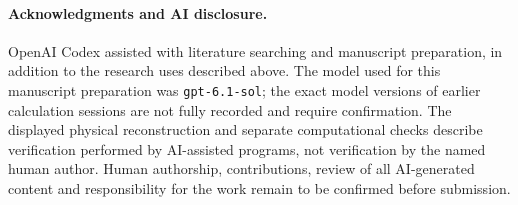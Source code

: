 \documentclass[11pt]{article}
\begin{document}
\paragraph{Acknowledgments and AI disclosure.}
OpenAI Codex assisted with literature searching and manuscript preparation,
in addition to the research uses described above. The model used for this
manuscript preparation was \texttt{gpt-6.1-sol}; the exact model versions of
earlier calculation sessions are not fully recorded and require confirmation.
The displayed physical reconstruction and separate computational checks
describe verification performed by AI-assisted programs, not verification by
the named human author. Human authorship, contributions, review of all
AI-generated content and responsibility for the work remain to be confirmed
before submission.



\end{document}
